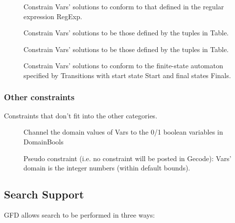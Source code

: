 \begin{description}
\item[]
Constrain Vars' solutions to conform to that defined in the regular expression RegExp.

\item[]
Constrain Vars' solutions to be those defined by the tuples in Table.

\item[]
Constrain Vars' solutions to be those defined by the tuples in Table.

\item[]
Constrain Vars' solutions to conform to the finite-state 
automaton specified by Transitions with start state Start and  final states Finals.

\end{description}

\subsubsection{Other constraints}

Constraints that don't fit into the other categories.

\begin{description}

\item[]
Channel the domain values of Vars to the 0/1 boolean variables in DomainBools

\item[]
Pseudo constraint (i.e. no constraint will be posted in Gecode): Vars' domain is the integer numbers (within default bounds).

\end{description}


\subsection{Search Support}

GFD allows search to be performed in three ways:

